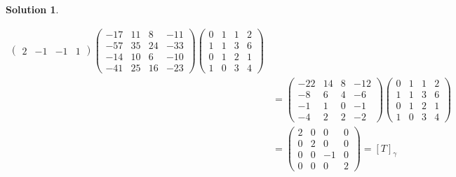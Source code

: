 \documentclass[10pt]{article}
\theoremstyle{definition}
\newtheorem{soln}{Solution}
\begin{document}
\begin{soln}
\begin{enumerate}[label=(\alph*)]
\begin{align*}
\begin{pmatrix}
              2   & -1 & -1 & 1
            \end{pmatrix}
            \begin{pmatrix}
              -17 & 11 & 8  & -11 \\
              -57 & 35 & 24 & -33 \\
              -14 & 10 & 6  & -10 \\
              -41 & 25 & 16 & -23
            \end{pmatrix}
            \begin{pmatrix}
              0 & 1 & 1 & 2 \\
              1 & 1 & 3 & 6 \\
              0 & 1 & 2 & 1 \\
              1 & 0 & 3 & 4
            \end{pmatrix}                                                                                    \\
             & =
            \begin{pmatrix}
              -22 & 14 & 8 & -12 \\
              -8  & 6  & 4 & -6  \\
              -1  & 1  & 0 & -1  \\
              -4  & 2  & 2 & -2
            \end{pmatrix}
            \begin{pmatrix}
              0 & 1 & 1 & 2 \\
              1 & 1 & 3 & 6 \\
              0 & 1 & 2 & 1 \\
              1 & 0 & 3 & 4
            \end{pmatrix}                                                                                    \\
             & =
            \begin{pmatrix}
              2 & 0 & 0  & 0 \\
              0 & 2 & 0  & 0 \\
              0 & 0 & -1 & 0 \\
              0 & 0 & 0  & 2
            \end{pmatrix}=\left[T\right]_\gamma                                                               \\
          \end{align*}
  \end{enumerate}
\end{soln}
\newpage
\end{document}
